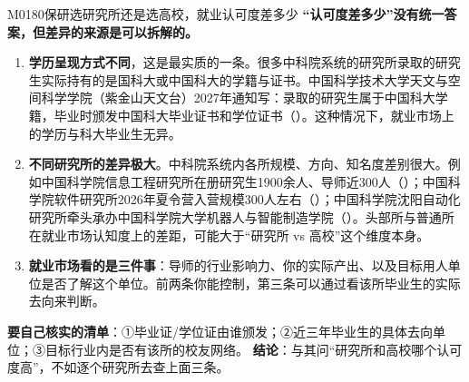 \begin{qa}{M0180}{保研选研究所还是选高校，就业认可度差多少}
\textbf{“认可度差多少”没有统一答案，但差异的来源是可以拆解的。}
\begin{enumerate}
  \item \textbf{学历呈现方式不同}，这是最实质的一条。很多中科院系统的研究所录取的研究生实际持有的是国科大或中国科大的学籍与证书。中国科学技术大学天文与空间科学学院（紫金山天文台）2027年通知写：录取的研究生属于中国科大学籍，毕业时颁发中国科大毕业证书和学位证书（）。这种情况下，就业市场上的学历与科大毕业生无异。
  \item \textbf{不同研究所的差异极大}。中科院系统内各所规模、方向、知名度差别很大。例如中国科学院信息工程研究所在册研究生1900余人、导师近300人（）；中国科学院软件研究所2026年夏令营入营规模300人左右（）；中国科学院沈阳自动化研究所牵头承办中国科学院大学机器人与智能制造学院（）。头部所与普通所在就业市场认知度上的差距，可能大于“研究所 vs 高校”这个维度本身。
  \item \textbf{就业市场看的是三件事}：导师的行业影响力、你的实际产出、以及目标用人单位是否了解这个单位。前两条你能控制，第三条可以通过看该所毕业生的实际去向来判断。
\end{enumerate}
\textbf{要自己核实的清单}：①毕业证/学位证由谁颁发；②近三年毕业生的具体去向单位；③目标行业内是否有该所的校友网络。
\textbf{结论}：与其问“研究所和高校哪个认可度高”，不如逐个研究所去查上面三条。
\end{qa}

